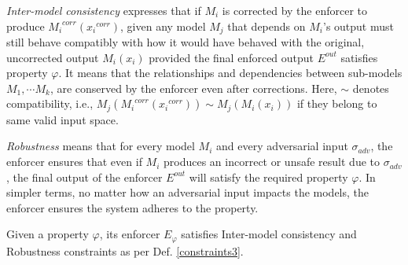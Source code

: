 \textit{Inter-model consistency} expresses that if $M_i$ is corrected by the enforcer to produce ${M_i}^{corr}({x_i}^{corr})$, given any model $M_j$ that depends on $M_i$'s output must still behave compatibly with how it would have behaved with the original, uncorrected output $M_i(x_i)$ provided the final enforced output $E^{out}$ satisfies property $\varphi$. It means that the relationships and dependencies between sub-models $M_1,\cdots M_k$, are conserved by the enforcer even after corrections. Here, $\sim$ denotes compatibility, i.e., $M_j({M_i}^{corr}({x_i}^{corr})) \sim M_j(M_i(x_i))$ if they belong to same valid input space.

\textit{Robustness} means that for every model $M_i$ and every adversarial input $\sigma_{adv}$, the enforcer ensures that even if $M_i$ produces an incorrect or unsafe result due to $\sigma_{adv}$, the final output of the enforcer $E^{out}$ will satisfy the required property $\varphi$. In simpler terms, no matter how an adversarial input impacts the models, the enforcer ensures the system adheres to the property.

\begin{proposition}
    Given a property $\varphi$, its enforcer $E_{\varphi}$ satisfies Inter-model consistency and Robustness constraints as per Def. \ref{constraints3}.
    \label{propo1}
\end{proposition}
